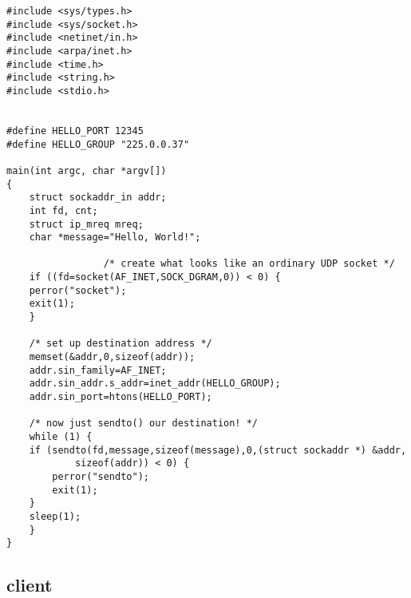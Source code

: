 \documentclass[12pt]{article}
\begin{document}
\begin{lstlisting}
#include <sys/types.h>
#include <sys/socket.h>
#include <netinet/in.h>
#include <arpa/inet.h>
#include <time.h>
#include <string.h>
#include <stdio.h>


#define HELLO_PORT 12345
#define HELLO_GROUP "225.0.0.37"

main(int argc, char *argv[])
{
    struct sockaddr_in addr;
    int fd, cnt;
    struct ip_mreq mreq;
    char *message="Hello, World!";

			     /* create what looks like an ordinary UDP socket */
    if ((fd=socket(AF_INET,SOCK_DGRAM,0)) < 0) {
	perror("socket");
	exit(1);
    }

    /* set up destination address */
    memset(&addr,0,sizeof(addr));
    addr.sin_family=AF_INET;
    addr.sin_addr.s_addr=inet_addr(HELLO_GROUP);
    addr.sin_port=htons(HELLO_PORT);

    /* now just sendto() our destination! */
    while (1) {
	if (sendto(fd,message,sizeof(message),0,(struct sockaddr *) &addr,
		    sizeof(addr)) < 0) {
	    perror("sendto");
	    exit(1);
	}
	sleep(1);
    }
}
\end{lstlisting}

\subsection{client}
\end{document}
